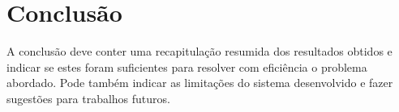 \chapter{Conclusão} 

A conclusão deve conter uma recapitulação resumida dos resultados obtidos e indicar
se estes foram suficientes para resolver com eficiência o problema abordado. Pode também
indicar as limitações do sistema desenvolvido e fazer sugestões para trabalhos futuros.
